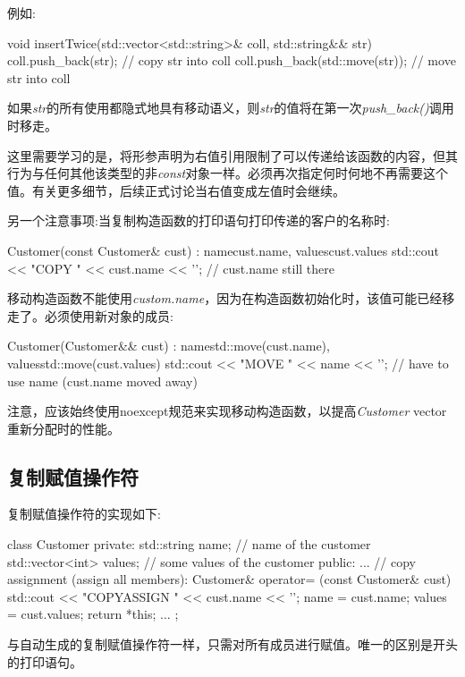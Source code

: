 例如:

\begin{cppcode}
void insertTwice(std::vector<std::string>& coll, std::string&& str)
{
	coll.push_back(str); // copy str into coll
	coll.push_back(std::move(str)); // move str into coll
}
\end{cppcode}

如果\textit{str}的所有使用都隐式地具有移动语义，则\textit{str}的值将在第一次\textit{push_back()}调用时移走。

这里需要学习的是，将形参声明为右值引用限制了可以传递给该函数的内容，但其行为与任何其他该类型的非\textit{const}对象一样。必须再次指定何时何地不再需要这个值。有关更多细节，后续正式讨论当右值变成左值时会继续。

另一个注意事项:当复制构造函数的打印语句打印传递的客户的名称时:

\begin{cppcode}
Customer(const Customer& cust)
: name{cust.name}, values{cust.values} {
	std::cout << "COPY " << cust.name << '\n'; // cust.name still there
}
\end{cppcode}

移动构造函数不能使用\textit{custom.name}，因为在构造函数初始化时，该值可能已经移走了。必须使用新对象的成员:

\begin{cppcode}
Customer(Customer&& cust)
: name{std::move(cust.name)}, values{std::move(cust.values)} {
	std::cout << "MOVE " << name << '\n'; // have to use name (cust.name moved away)
}
\end{cppcode}

注意，应该始终使用noexcept规范来实现移动构造函数，以提高\textit{Customer} vector重新分配时的性能。

\subsection{复制赋值操作符}

复制赋值操作符的实现如下:

\begin{cppcode}
class Customer {
	private:
	std::string name; // name of the customer
	std::vector<int> values; // some values of the customer
	public:
	...
	// copy assignment (assign all members):
	Customer& operator= (const Customer& cust) {
		std::cout << "COPYASSIGN " << cust.name << '\n';
		name = cust.name;
		values = cust.values;
		return *this;
	}
...
};
\end{cppcode}

与自动生成的复制赋值操作符一样，只需对所有成员进行赋值。唯一的区别是开头的打印语句。

